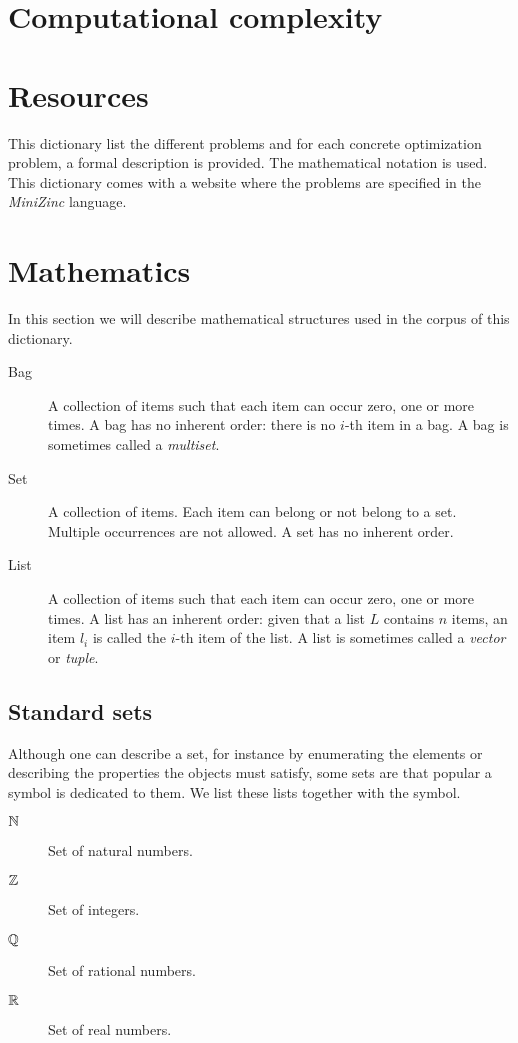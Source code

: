 \documentclass{../SharedData/dictionaryclass}
\newcommand{\nmn}[1]{\index{#1}\emph{#1}}
\begin{document}
\section*{Computational complexity}
\section*{Resources}
This dictionary list the different problems and for each concrete optimization problem, a formal description is provided. The mathematical notation is used. This dictionary comes with a website where the problems are specified in the \nmn{MiniZinc} language.
\glsaddall
\printglossaries
\clearpage{}
\section*{Mathematics}
In this section we will describe mathematical structures used in the corpus of this dictionary.
\begin{description}
 \item [Bag] A collection of items such that each item can occur zero, one or more times. A bag has no inherent order: there is no $i$-th item in a bag. A bag is sometimes called a \nmn{multiset}.
 \item [Set] A collection of items. Each item can belong or not belong to a set. Multiple occurrences are not allowed. A set has no inherent order.
 \item [List] A collection of items such that each item can occur zero, one or more times. A list has an inherent order: given that a list $L$ contains $n$ items, an item $l_i$ is called the $i$-th item of the list. A list is sometimes called a \nmn{vector} or \nmn{tuple}.
\end{description}
\subsection*{Standard sets}
Although one can describe a set, for instance by enumerating the elements or describing the properties the objects must satisfy, some sets are that popular a symbol is dedicated to them. We list these lists together with the symbol.
\begin{description}
 \item [$\mathbb{N}$] Set of natural numbers.
 \item [$\mathbb{Z}$] Set of integers.
 \item [$\mathbb{Q}$] Set of rational numbers.
 \item [$\mathbb{R}$] Set of real numbers.
\end{description}
\end{document}
